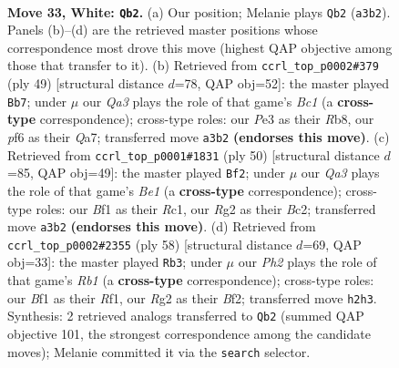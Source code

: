 \documentclass[11pt]{article}
\begin{document}
\clearpage

\begin{figure}[p]\centering
\begin{subfigure}{0.46\textwidth}\centering
\resizebox{\linewidth}{!}{%
\newchessgame
\chessboard[
  setfen={1r1rnk2/p1p5/5p2/2Pp1q2/5P1p/QP2P3/3BK1RP/5BR1 w - - 0 33},
  showmover=false,
  pgfstyle=straightmove, color=movearrow, markmove={a3-b2}
]}
\caption{}
\end{subfigure}\hfill
\begin{subfigure}{0.46\textwidth}\centering
\resizebox{\linewidth}{!}{%
\newchessgame
\chessboard[
  setfen={1rbr3k/q5pp/3p1p2/Pp2pP2/1Q2P3/8/1P1N2PP/2RR3K b - - 5 25},
  showmover=false,
  pgfstyle=straightmove, color=movearrow, markmove={c8-b7}
]}
\caption{}
\end{subfigure}
\\[4pt]
\begin{subfigure}{0.46\textwidth}\centering
\resizebox{\linewidth}{!}{%
\newchessgame
\chessboard[
  setfen={6k1/pr3pb1/4qnp1/2p5/1p1rP3/5P2/PPB3PQ/1KR1B2R w - - 2 26},
  showmover=false,
  pgfstyle=straightmove, color=movearrow, markmove={e1-f2}
]}
\caption{}
\end{subfigure}\hfill
\begin{subfigure}{0.46\textwidth}\centering
\resizebox{\linewidth}{!}{%
\newchessgame
\chessboard[
  setfen={2r1r1k1/5pp1/5n1p/qp1p4/8/2P1PP2/3Q1BPP/1R3RK1 w - - 0 30},
  showmover=false,
  pgfstyle=straightmove, color=movearrow, markmove={b1-b3}
]}
\caption{}
\end{subfigure}
\caption{\textbf{Move 33, White: \texttt{Qb2}.} (a) Our position; Melanie plays \texttt{Qb2} (\texttt{a3b2}). Panels (b)--(d) are the retrieved master positions whose correspondence most drove this move (highest QAP objective among those that transfer to it). (b) Retrieved from \texttt{ccrl\_top\_p0002\#379} (ply 49) [structural distance $d$=78, QAP obj=52]: the master played \texttt{Bb7}; under $\mu$ our \emph{Qa3} plays the role of that game's \emph{Bc1} (a \textbf{cross-type} correspondence); cross-type roles: our \emph{P}e3 as their \emph{R}b8, our \emph{p}f6 as their \emph{Q}a7; transferred move \texttt{a3b2} \textbf{(endorses this move)}. (c) Retrieved from \texttt{ccrl\_top\_p0001\#1831} (ply 50) [structural distance $d$=85, QAP obj=49]: the master played \texttt{Bf2}; under $\mu$ our \emph{Qa3} plays the role of that game's \emph{Be1} (a \textbf{cross-type} correspondence); cross-type roles: our \emph{B}f1 as their \emph{R}c1, our \emph{R}g2 as their \emph{B}c2; transferred move \texttt{a3b2} \textbf{(endorses this move)}. (d) Retrieved from \texttt{ccrl\_top\_p0002\#2355} (ply 58) [structural distance $d$=69, QAP obj=33]: the master played \texttt{Rb3}; under $\mu$ our \emph{Ph2} plays the role of that game's \emph{Rb1} (a \textbf{cross-type} correspondence); cross-type roles: our \emph{B}f1 as their \emph{R}f1, our \emph{R}g2 as their \emph{B}f2; transferred move \texttt{h2h3}. Synthesis: 2 retrieved analogs transferred to \texttt{Qb2} (summed QAP objective 101, the strongest correspondence among the candidate moves); Melanie committed it via the \texttt{search} selector.}
\label{fig:thought-m64}
\end{figure}
\end{document}
